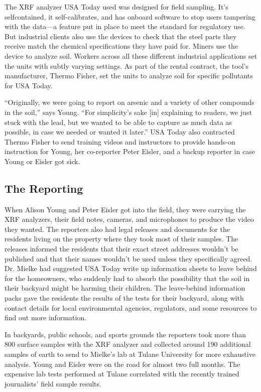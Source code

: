 The XRF analyzer USA Today used was designed for field sampling. It's selfcontained,
it self-calibrates, and has onboard software to stop users tampering
with the data—a feature put in place to meet the standard for regulatory
use. But industrial clients also use the devices to check that the steel parts
they receive match the chemical specifications they have paid for. Miners
use the device to analyze soil. Workers across all these different industrial
applications set the units with subtly varying settings. As part of the rental
contract, the tool's manufacturer, Thermo Fisher, set the units to analyze
soil for specific pollutants for USA Today.

``Originally, we were going to report on arsenic and a variety of other compounds
in the soil,'' says Young. ``For simplicity's sake [in] explaining to readers,
we just stuck with the lead, but we wanted to be able to capture as much
data as possible, in case we needed or wanted it later.'' USA Today also contracted
Thermo Fisher to send training videos and instructors to provide
hands-on instruction for Young, her co-reporter Peter Eisler, and a backup
reporter in case Young or Eisler got sick.

\subsection{The Reporting}
When Alison Young and Peter Eisler got into the field, they were carrying the
XRF analyzers, their field notes, cameras, and microphones to produce the
video they wanted. The reporters also had legal releases and documents for
the residents living on the property where they took most of their samples.
The releases informed the residents that their exact street addresses wouldn't
be published and that their names wouldn't be used unless they specifically
agreed. Dr. Mielke had suggested USA Today write up information sheets
to leave behind for the homeowners, who suddenly had to absorb the possibility
that the soil in their backyard might be harming their children. The
leave-behind information packs gave the residents the results of the tests for
their backyard, along with contact details for local environmental agencies,
regulators, and some resources to find out more information.

In backyards, public schools, and sports grounds the reporters took more
than 800 surface samples with the XRF analyzer and collected around 190
additional samples of earth to send to Mielke's lab at Tulane University for
more exhaustive analysis. Young and Eisler were on the road for almost two
full months. The expensive lab tests performed at Tulane correlated with
the recently trained journalists' field sample results.

